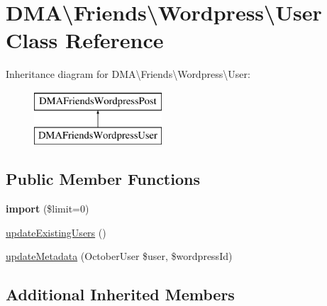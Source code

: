 \hypertarget{classDMA_1_1Friends_1_1Wordpress_1_1User}{\section{D\-M\-A\textbackslash{}Friends\textbackslash{}Wordpress\textbackslash{}User Class Reference}
\label{classDMA_1_1Friends_1_1Wordpress_1_1User}
}
Inheritance diagram for D\-M\-A\textbackslash{}Friends\textbackslash{}Wordpress\textbackslash{}User\-:\begin{figure}[H]
\begin{center}
\leavevmode
\includegraphics[height=2.000000cm]{dd/d73/classDMA_1_1Friends_1_1Wordpress_1_1User}
\end{center}
\end{figure}
\subsection*{Public Member Functions}
\begin{DoxyCompactItemize}
\item 
\hypertarget{classDMA_1_1Friends_1_1Wordpress_1_1User_ab33f393b12ecbd1a7a274a041006348f}{{\bfseries import} (\$limit=0)}\label{classDMA_1_1Friends_1_1Wordpress_1_1User_ab33f393b12ecbd1a7a274a041006348f}

\item 
\hyperlink{classDMA_1_1Friends_1_1Wordpress_1_1User_a9664b94f73cb6ed82746b94d9bdac91b}{update\-Existing\-Users} ()
\item 
\hyperlink{classDMA_1_1Friends_1_1Wordpress_1_1User_aa2d2c2c9b82db76a0eab7af41629e011}{update\-Metadata} (October\-User \$user, \$wordpress\-Id)
\end{DoxyCompactItemize}
\subsection*{Additional Inherited Members}


